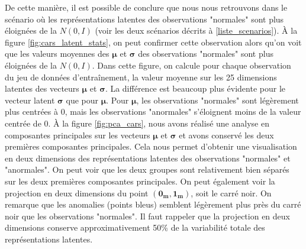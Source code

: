 De cette manière, il est possible de conclure que nous nous retrouvons dans le scénario où les représentations latentes des observations "normales" sont plus éloignées de la $N(0,I)$ (voir les deux scénarios décrits à \ref{liste_scenarios}). À la figure \ref{fig:cars_latent_stats}, on peut confirmer cette observation alors qu'on voit que les valeurs moyennes des $\boldsymbol{\mu}$ et $\boldsymbol{\sigma}$ des observations "normales" sont plus éloignées de la $N(0,I)$. Dans cette figure, on calcule pour chaque observation du jeu de données d'entraînement, la valeur moyenne sur les 25 dimensions latentes des vecteurs $\boldsymbol{\mu}$ et $\boldsymbol{\sigma}$. La différence est beaucoup plus évidente pour le vecteur latent $\boldsymbol{\sigma}$ que pour $\boldsymbol{\mu}$. Pour $\boldsymbol{\mu}$, les observations "normales" sont légèrement plus centrées à 0, mais les observations "anormales" s'éloignent moins de la valeur centrée de 0. À la figure \ref{fig:pca_cars}, nous avons réalisé une analyse en composantes principales sur les vecteurs $\boldsymbol{\mu}$ et $\boldsymbol{\sigma}$ et avons conservé les deux premières composantes principales. Cela nous permet d'obtenir une visualisation en deux dimensions des représentations latentes des observations "normales" et "anormales". On peut voir que les deux groupes sont relativement bien séparés sur les deux premières composantes principales. On peut également voir la projection en deux dimensions du point $(\boldsymbol{0_{m}}, \boldsymbol{1_{m}})$, soit le carré noir. On remarque que les anomalies (points bleus) semblent légèrement plus près du carré noir que les observations "normales". Il faut rappeler que la projection en deux dimensions conserve approximativement 50\% de la variabilité totale des représentations latentes.

